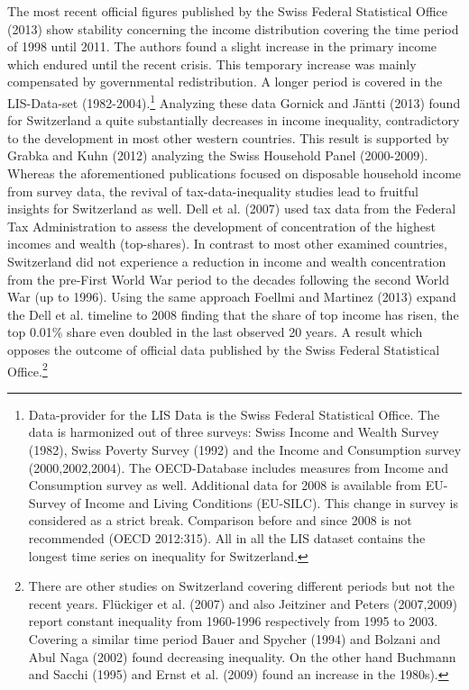 \documentclass[twoside]{article}\usepackage[]{graphicx}\usepackage[]{color}
\begin{document}
\begin{multicols}{2}
The most recent official figures published by the Swiss Federal Statistical Office (2013) show stability concerning the income distribution covering the time period of 1998 until 2011. The authors found a slight increase in the primary income which endured until the recent crisis. This temporary increase was mainly compensated by governmental redistribution. A longer period is covered in the LIS-Data-set (1982-2004).\footnote{Data-provider for the LIS Data is the Swiss Federal Statistical Office. The data is harmonized out of three surveys: Swiss Income and Wealth Survey (1982), Swiss Poverty Survey (1992) and the Income and Consumption survey (2000,2002,2004). The OECD-Database includes measures from Income and Consumption survey as well. Additional data for 2008 is available from EU-Survey of Income and Living Conditions (EU-SILC). This change in survey is considered as a strict break. Comparison before and since 2008 is not recommended (OECD 2012:315). All in all the LIS dataset contains the longest time series on inequality for Switzerland.} Analyzing these data Gornick and Jäntti (2013) found for Switzerland a quite substantially decreases in income inequality, contradictory to the development in most other western countries. This result is supported by Grabka and Kuhn (2012) analyzing the Swiss Household Panel (2000-2009). \\


Whereas the aforementioned publications focused on disposable household income from survey data, the revival of tax-data-inequality studies lead to fruitful insights for Switzerland as well. Dell et al. (2007) used tax data from the Federal Tax Administration to assess the development of concentration of the highest incomes and wealth (top-shares). In contrast to most other examined countries, Switzerland did not experience a reduction in income and wealth concentration from the pre-First World War period to the decades following the second World War (up to 1996). Using the same approach Foellmi and Martinez (2013) expand the Dell et al. timeline to 2008 finding that the share of top income has risen, the top 0.01\% share even doubled in the last observed 20 years. A result which opposes the outcome of official data published by the Swiss Federal Statistical Office.\footnote{There are other studies on Switzerland covering different periods but not the recent years. Flückiger et al. (2007) and also Jeitziner and Peters (2007,2009) report constant inequality from 1960-1996 respectively from 1995 to 2003. Covering a similar time period Bauer and Spycher (1994) and Bolzani and Abul Naga (2002) found decreasing inequality. On the other hand Buchmann and Sacchi (1995) and Ernst et al. (2009) found an increase in the 1980s).} \\



\end{multicols}
\end{document}
